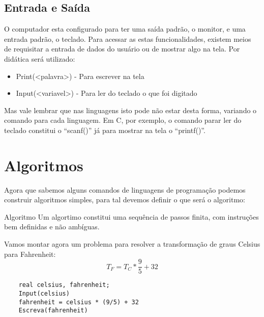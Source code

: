 \subsection{Entrada e Saída}
O computador esta configurado para ter uma saída padrão, o monitor, e uma entrada padrão, o teclado. Para acessar as estas funcionalidades, existem meios de requisitar a entrada de dados do usuário ou de mostrar algo na tela. Por didática será utilizado:
\begin{itemize}
    \item Print(<palavra>) - Para escrever na tela
    \item Input(<variavel>) - Para ler do teclado o que foi digitado
\end{itemize}
Mas vale lembrar que nas linguagens isto pode não estar desta forma, variando o comando para cada linguagem. Em C, por exemplo, o comando parar ler do teclado constitui o ``scanf()'' já para mostrar na tela o ``printf()''.

\section{Algoritmos}
Agora que sabemos alguns comandos de linguagens de programação podemos construir algoritmos simples, para tal devemos definir o que será o algoritmo: \\
\begin{definicao}{Algoritmo}
    Um algortimo constitui uma sequência de passos finita, com instruções bem definidas e não ambíguas.
\end{definicao}

Vamos montar agora um problema para resolver a transformação de graus Celsius para Fahrenheit:
\begin{equation}
    T_{F} = T_{C} * \frac{9}{5} + 32
\end{equation}

\begin{lstlisting}
    real celsius, fahrenheit;
    Input(celsius)
    fahrenheit = celsius * (9/5) + 32
    Escreva(fahrenheit)
\end{lstlisting}